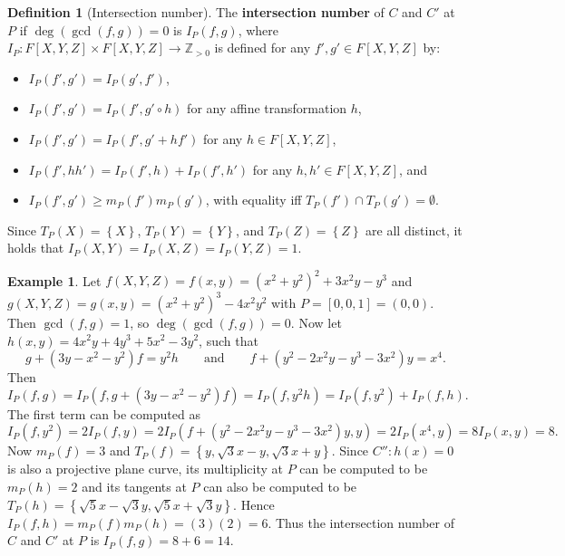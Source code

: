 \documentclass{article}
\newcommand{\Z}{\mathbb{Z}}
\newcommand{\rb}[1]{\left( #1 \right)}
\renewcommand{\sb}[1]{\left[ #1 \right]}
\newcommand{\cb}[1]{\left\{ #1 \right\}}
\theoremstyle{definition}
\newtheorem*{definition}{Definition}
\newtheorem*{example}{Example}
\begin{document}
\begin{definition}[Intersection number]
The \textbf{intersection number} of $ C $ and $ C' $ at $ P $ if $ \deg\rb{\gcd\rb{f, g}} = 0 $ is $ I_P\rb{f, g} $, where $ I_P : F\sb{X, Y, Z} \times F\sb{X, Y, Z} \to \Z_{> 0} $ is defined for any $ f', g' \in F\sb{X, Y, Z} $ by:
\begin{itemize}
\item $ I_P\rb{f', g'} = I_P\rb{g', f'} $,
\item $ I_P\rb{f', g'} = I_P\rb{f', g' \circ h} $ for any affine transformation $ h $,
\item $ I_P\rb{f', g'} = I_P\rb{f', g' + hf'} $ for any $ h \in F\sb{X, Y, Z} $,
\item $ I_P\rb{f', hh'} = I_P\rb{f', h} + I_P\rb{f', h'} $ for any $ h, h' \in F\sb{X, Y, Z} $, and
\item $ I_P\rb{f', g'} \ge m_P\rb{f'} m_P\rb{g'} $, with equality iff $ T_P\rb{f'} \cap T_P\rb{g'} = \emptyset $.
\end{itemize}
\end{definition}

Since $ T_P\rb{X} = \cb{X} $, $ T_P\rb{Y} = \cb{Y} $, and $ T_P\rb{Z} = \cb{Z} $ are all distinct, it holds that $ I_P\rb{X, Y} = I_P\rb{X, Z} = I_P\rb{Y, Z} = 1 $.

\pagebreak

\begin{example}
Let $ f\rb{X, Y, Z} = f\rb{x, y} = \rb{x^2 + y^2}^2 + 3x^2y - y^3 $ and $ g\rb{X, Y, Z} = g\rb{x, y} = \rb{x^2 + y^2}^3 - 4x^2y^2 $ with $ P = \sb{0, 0, 1} = \rb{0, 0} $. Then $ \gcd\rb{f, g} = 1 $, so $ \deg\rb{\gcd\rb{f, g}} = 0 $. Now let $ h\rb{x, y} = 4x^2y + 4y^3 + 5x^2 - 3y^2 $, such that
$$ g + \rb{3y - x^2 - y^2}f = y^2h \qquad \text{and} \qquad f + \rb{y^2 - 2x^2y - y^3 - 3x^2}y = x^4. $$
Then
$$ I_P\rb{f, g} = I_P\rb{f, g + \rb{3y - x^2 - y^2}f} = I_P\rb{f, y^2h} = I_P\rb{f, y^2} + I_P\rb{f, h}. $$
The first term can be computed as
$$ I_P\rb{f, y^2} = 2I_P\rb{f, y} = 2I_P\rb{f + \rb{y^2 - 2x^2y - y^3 - 3x^2}y, y} = 2I_P\rb{x^4, y} = 8I_P\rb{x, y} = 8. $$
Now $ m_P\rb{f} = 3 $ and $ T_P\rb{f} = \cb{y, \sqrt{3}x - y, \sqrt{3}x + y} $. Since $ C'' : h\rb{x} = 0 $ is also a projective plane curve, its multiplicity at $ P $ can be computed to be $ m_P\rb{h} = 2 $ and its tangents at $ P $ can also be computed to be $ T_P\rb{h} = \cb{\sqrt{5}x - \sqrt{3}y, \sqrt{5}x + \sqrt{3}y} $. Hence $ I_P\rb{f, h} = m_P\rb{f} m_P\rb{h} = \rb{3}\rb{2} = 6 $. Thus the intersection number of $ C $ and $ C' $ at $ P $ is $ I_P\rb{f, g} = 8 + 6 = 14 $.
\end{example}
\end{document}
